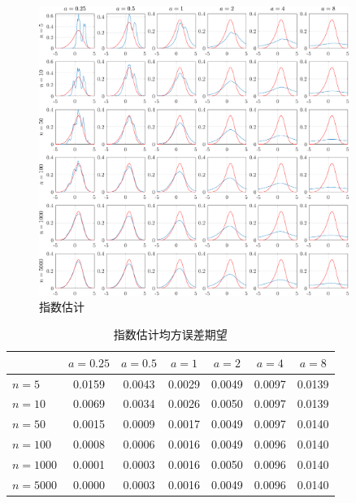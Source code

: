 \documentclass[openany]{ctexbook}
\theoremstyle{kaiti}
\theoremstyle{normal}
\begin{document}
\begin{figure}[htbp]
  \centering
  \includegraphics[width=0.9\textwidth]{exponentialWindow.pdf}
  \caption{指数估计}
  \label{fig:expwin}
\end{figure}

\begin{table}[htbp]
  \centering
  \begin{tabular}{l|cccccc}
  \hline
           & $a=0.25$ & $a=0.5$ & $a=1$  & $a=2$  & $a=4$  & $a=8$  \\ \hline
  $n=5$    & 0.0159   & 0.0043  & 0.0029 & 0.0049 & 0.0097 & 0.0139 \\
  $n=10$   & 0.0069   & 0.0034  & 0.0026 & 0.0050 & 0.0097 & 0.0139 \\
  $n=50$   & 0.0015   & 0.0009  & 0.0017 & 0.0049 & 0.0097 & 0.0140 \\
  $n=100$  & 0.0008   & 0.0006  & 0.0016 & 0.0049 & 0.0096 & 0.0140 \\
  $n=1000$ & 0.0001   & 0.0003  & 0.0016 & 0.0050 & 0.0096 & 0.0140 \\
  $n=5000$ & 0.0000   & 0.0003  & 0.0016 & 0.0049 & 0.0096 & 0.0140 \\ \hline
  \end{tabular}
  \caption{指数估计均方误差期望}
  \label{tab:expMeanMSE}
\end{table}
\end{document}

